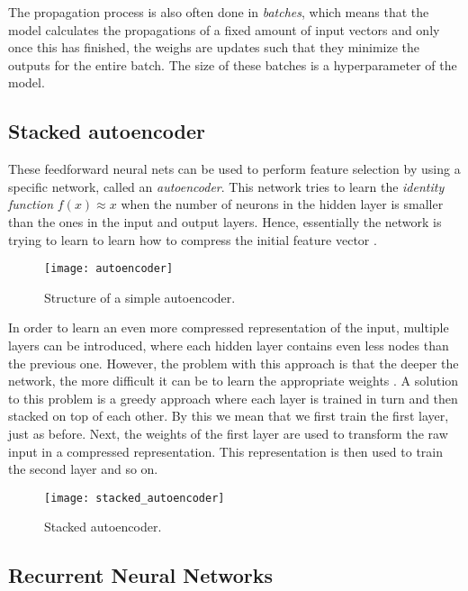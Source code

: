 The propagation process is also often done in \textit{batches}, which means that the model calculates the propagations of a fixed amount of input vectors and only once this has finished, the weighs are updates such that they minimize the outputs for the entire batch.
The size of these batches is a hyperparameter of the model.

\subsection{Stacked autoencoder}

These feedforward neural nets can be used to perform feature selection by using a specific network, called an \textit{autoencoder}.
This network tries to learn the \textit{identity function} $f(x) \approx x$ when the number of neurons in the hidden layer is smaller than the ones in the input and output layers.
Hence, essentially the network is trying to learn to learn how to compress the initial feature vector \cite{autoencoders}.

\begin{figure}[ht]
  \centering
  \texttt{[image: autoencoder]}
  \caption{Structure of a simple autoencoder.}
  \label{fig:autoencoder}
\end{figure}

In order to learn an even more compressed representation of the input, multiple layers can be introduced, where each hidden layer contains even less nodes than the previous one.
However, the problem with this approach is that the deeper the network, the more difficult it can be to learn the appropriate weights \cite{nielsen_2017}.
A solution to this problem is a greedy approach where each layer is trained in turn and then stacked on top of each other.
By this we mean that we first train the first layer, just as before.
Next, the weights of the first layer are used to transform the raw input in a compressed representation.
This representation is then used to train the second layer and so on.

\begin{figure}[ht]
  \centering
  \texttt{[image: stacked\_autoencoder]}
  \caption{Stacked autoencoder.}
  \label{fig:stacked-autoencoder}
\end{figure}

\newpage

\subsection{Recurrent Neural Networks}

